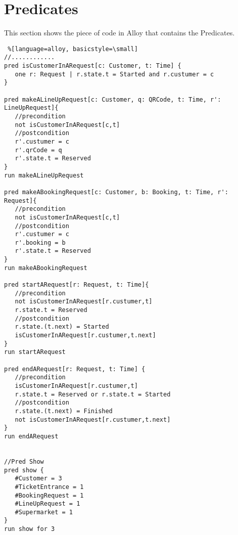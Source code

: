 \section{Predicates}
This section shows the piece of code in Alloy that contains the Predicates. \\

\begin{lstlisting} %[language=alloy, basicstyle=\small] 
//............
pred isCustomerInARequest[c: Customer, t: Time] {
   one r: Request | r.state.t = Started and r.custumer = c
}

pred makeALineUpRequest[c: Customer, q: QRCode, t: Time, r': LineUpRequest]{
   //precondition
   not isCustomerInARequest[c,t]
   //postcondition
   r'.custumer = c
   r'.qrCode = q
   r'.state.t = Reserved
}
run makeALineUpRequest

pred makeABookingRequest[c: Customer, b: Booking, t: Time, r': Request]{
   //precondition
   not isCustomerInARequest[c,t]
   //postcondition
   r'.custumer = c
   r'.booking = b
   r'.state.t = Reserved
}
run makeABookingRequest

pred startARequest[r: Request, t: Time]{
   //precondition
   not isCustomerInARequest[r.custumer,t]
   r.state.t = Reserved
   //postcondition
   r.state.(t.next) = Started
   isCustomerInARequest[r.custumer,t.next]
}
run startARequest

pred endARequest[r: Request, t: Time] {
   //precondition
   isCustomerInARequest[r.custumer,t]
   r.state.t = Reserved or r.state.t = Started
   //postcondition
   r.state.(t.next) = Finished
   not isCustomerInARequest[r.custumer,t.next]
}
run endARequest


//Pred Show
pred show {
   #Customer = 3
   #TicketEntrance = 1
   #BookingRequest = 1
   #LineUpRequest = 1
   #Supermarket = 1
}
run show for 3
\end{lstlisting}





 
 